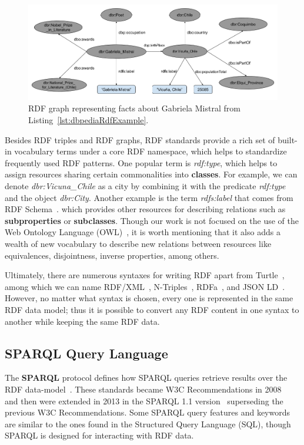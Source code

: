 \begin{figure}[!h]
    \centering
    \includegraphics[scale=.45]{imagenes/2_theorical_framework/exampleDbpediaGraph.png}
    \caption{RDF graph representing facts about Gabriela Mistral from Listing~\ref{lst:dbpediaRdfExample}.}
    \label{fig:dbpediaGraphExample}
\end{figure}

Besides RDF triples and RDF graphs, RDF standards provide a rich set of built-in 
vocabulary terms under a core RDF namespace, which helps to standardize frequently used 
RDF patterns. One popular term is \textit{rdf:type}, which helps to assign resources 
sharing certain commonalities into \textbf{classes}. For example, we can denote 
\textit{dbr:Vicuna\_Chile} as a city by combining it with the predicate \textit{rdf:type} 
and the object \textit{dbr:City}. Another example is the term \textit{rdfs:label} that 
comes from RDF Schema~\cite{key:rdfsold}. which provides other resources for describing 
relations such as \textbf{subproperties} or \textbf{subclasses}. Though our work is not 
focused on the use of the Web Ontology Language (OWL)~\cite{key:owl2rationale, key:owloverview}, 
it is worth mentioning that it also adds a wealth of new vocabulary to describe new 
relations between resources like equivalences, disjointness, inverse properties, among others.

Ultimately, there are numerous syntaxes for writing RDF apart from Turtle~\cite{key:turtle}, among 
which we can name RDF/XML~\cite{key:rdfxml}, N-Triples~\cite{key:testcases}, RDFa~\cite{key:rdfa11p, key:rdfa}, 
and JSON LD~\cite{key:jsonld}. However, no matter what syntax is chosen, every one is 
represented in the same RDF data model; thus it is possible to convert any RDF content 
in one syntax to another while keeping the same RDF data.

\subsection{SPARQL Query Language}
\label{cap2:semWeb/sparql}
The \textbf{SPARQL} protocol defines how SPARQL queries retrieve results over the RDF 
data-model~\cite{key:sparql11protocol}. These standards became W3C Recommendations in 
2008~\cite{key:sparql} and then were extended in 2013 in the SPARQL 1.1 version~\cite{key:sparql11} 
superseding the previous W3C Recommendations. Some SPARQL query features and keywords are similar 
to the ones found in the Structured Query Language (SQL), though SPARQL is designed for interacting 
with RDF data.

